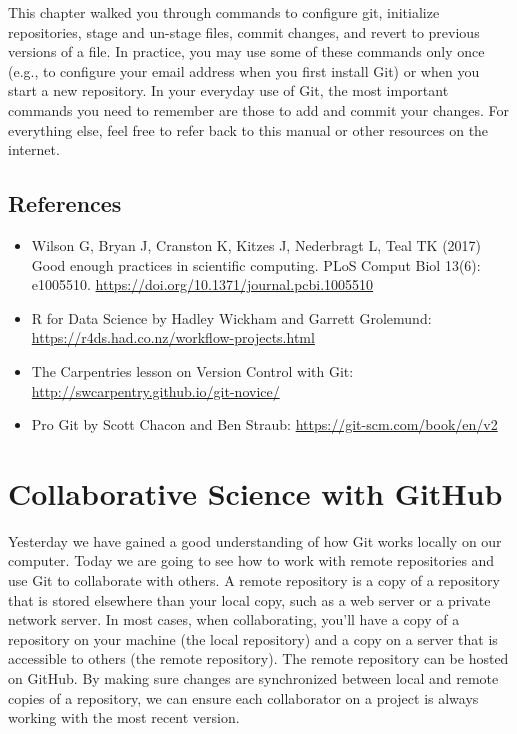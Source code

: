 \documentclass[
]{book}
\providecommand{\tightlist}{%
  \setlength{\itemsep}{0pt}\setlength{\parskip}{0pt}}
\begin{document}
This chapter walked you through commands to configure git, initialize repositories, stage and un-stage files, commit changes, and revert to previous versions of a file. In practice, you may use some of these commands only once (e.g., to configure your email address when you first install Git) or when you start a new repository. In your everyday use of Git, the most important commands you need to remember are those to add and commit your changes. For everything else, feel free to refer back to this manual or other resources on the internet.

\hypertarget{references}{%
\section{References}\label{references}}

\begin{itemize}
\tightlist
\item
  Wilson G, Bryan J, Cranston K, Kitzes J, Nederbragt L, Teal TK (2017) Good enough practices in scientific computing. PLoS Comput Biol 13(6): e1005510. \url{https://doi.org/10.1371/journal.pcbi.1005510}
\item
  R for Data Science by Hadley Wickham and Garrett Grolemund: \url{https://r4ds.had.co.nz/workflow-projects.html}
\item
  The Carpentries lesson on Version Control with Git: \url{http://swcarpentry.github.io/git-novice/}
\item
  Pro Git by Scott Chacon and Ben Straub: \url{https://git-scm.com/book/en/v2}
\end{itemize}

\hypertarget{git-hub}{%
\chapter{Collaborative Science with GitHub}\label{git-hub}}

Yesterday we have gained a good understanding of how Git works locally on our computer. Today we are going to see how to work with remote repositories and use Git to collaborate with others. A remote repository is a copy of a repository that is stored elsewhere than your local copy, such as a web server or a private network server. In most cases, when collaborating, you'll have a copy of a repository on your machine (the local repository) and a copy on a server that is accessible to others (the remote repository). The remote repository can be hosted on GitHub. By making sure changes are synchronized between local and remote copies of a repository, we can ensure each collaborator on a project is always working with the most recent version.
\end{document}
